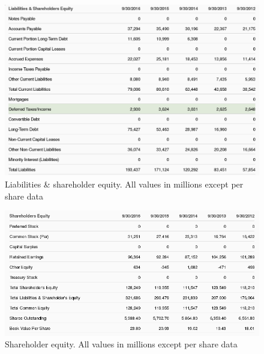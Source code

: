\documentclass[12pt,a4paper,titlepage]{article}
\begin{document}
\begin{figure}[!htb]
  \centering
  \includegraphics[width=.9\textwidth]{liabilities}
    \caption{Liabilities \& shareholder equity. All values in millions except
      per share data~\cite{zacks-bal}}
\end{figure}


\begin{figure}[!htb]
  \centering
  \includegraphics[width=1\textwidth]{shareholder}
    \caption{Shareholder equity. All values in millions except per share
      data~\cite{zacks-bal}}
\end{figure}

\newpage                        %
\end{document}

